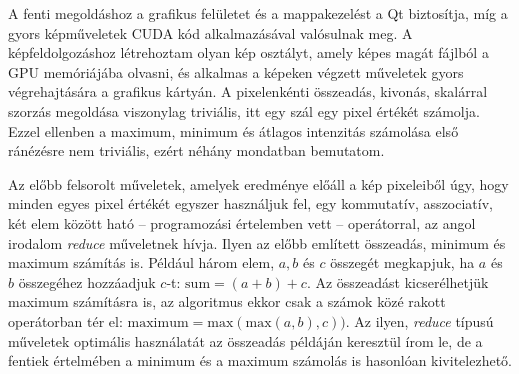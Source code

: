\documentclass[a4paper,12pt,twoside]{article}
\begin{document}
A fenti megoldáshoz a grafikus felületet és a mappakezelést a Qt biztosítja, míg a gyors képműveletek CUDA kód alkalmazásával valósulnak meg. A képfeldolgozáshoz létrehoztam olyan kép osztályt, amely képes magát fájlból a GPU memóriájába olvasni, és alkalmas a képeken végzett műveletek gyors végrehajtására a grafikus kártyán. A pixelenkénti összeadás, kivonás, skalárral szorzás megoldása viszonylag triviális, itt egy szál egy pixel értékét számolja. Ezzel ellenben a maximum, minimum és átlagos intenzitás számolása első ránézésre nem triviális, ezért néhány mondatban bemutatom. 

Az előbb felsorolt műveletek, amelyek eredménye előáll a kép pixeleiből úgy, hogy minden egyes pixel értékét egyszer használjuk fel, egy kommutatív, asszociatív, két elem között ható -- programozási értelemben vett -- operátorral, az angol irodalom  \emph{reduce} műveletnek hívja. Ilyen az előbb említett összeadás, minimum és maximum számítás is. Például három elem, $a,b$ és $c$ összegét megkapjuk, ha $a$ és $b$ összegéhez hozzáadjuk $c$-t: $\text{sum} = (a+b)+c$. Az összeadást kicserélhetjük maximum számításra is, az algoritmus ekkor csak a számok közé rakott operátorban tér el: $\text{maximum} = \text{max} ( \text{max}(a,b),c))$.  Az ilyen, \emph{reduce} típusú műveletek optimális használatát az összeadás példáján keresztül írom le, de a fentiek értelmében a minimum és a maximum számolás is hasonlóan kivitelezhető.
\end{document}
